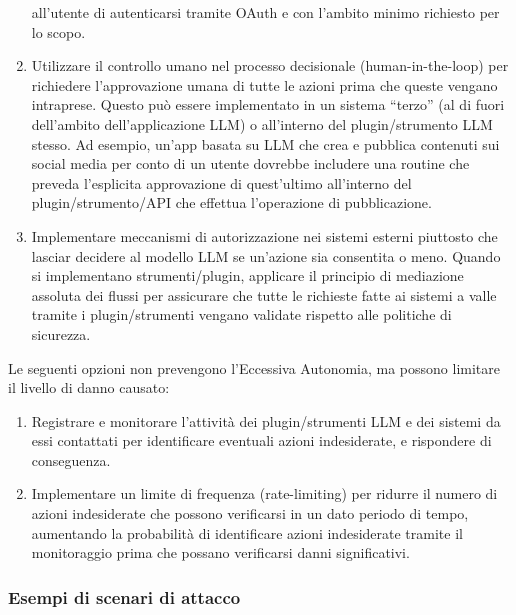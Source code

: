 \documentclass[
]{article}
\providecommand{\tightlist}{%
  \setlength{\itemsep}{0pt}\setlength{\parskip}{0pt}}
\begin{document}
\begin{enumerate}
  all'utente di autenticarsi tramite OAuth e con l'ambito minimo
  richiesto per lo scopo.
\item
  Utilizzare il controllo umano nel processo decisionale
  (human-in-the-loop) per richiedere l'approvazione umana di tutte le
  azioni prima che queste vengano intraprese. Questo può essere
  implementato in un sistema ``terzo'' (al di fuori dell'ambito
  dell'applicazione LLM) o all'interno del plugin/strumento LLM stesso.
  Ad esempio, un'app basata su LLM che crea e pubblica contenuti sui
  social media per conto di un utente dovrebbe includere una routine che
  preveda l'esplicita approvazione di quest'ultimo all'interno del
  plugin/strumento/API che effettua l'operazione di pubblicazione.
\item
  Implementare meccanismi di autorizzazione nei sistemi esterni
  piuttosto che lasciar decidere al modello LLM se un'azione sia
  consentita o meno. Quando si implementano strumenti/plugin, applicare
  il principio di mediazione assoluta dei flussi per assicurare che
  tutte le richieste fatte ai sistemi a valle tramite i plugin/strumenti
  vengano validate rispetto alle politiche di sicurezza.
\end{enumerate}

Le seguenti opzioni non prevengono l'Eccessiva Autonomia, ma possono
limitare il livello di danno causato:

\begin{enumerate}
\def\labelenumi{\arabic{enumi}.}
\tightlist
\item
  Registrare e monitorare l'attività dei plugin/strumenti LLM e dei
  sistemi da essi contattati per identificare eventuali azioni
  indesiderate, e rispondere di conseguenza.
\item
  Implementare un limite di frequenza (rate-limiting) per ridurre il
  numero di azioni indesiderate che possono verificarsi in un dato
  periodo di tempo, aumentando la probabilità di identificare azioni
  indesiderate tramite il monitoraggio prima che possano verificarsi
  danni significativi.
\end{enumerate}

\subsubsection{Esempi di scenari di
attacco}\label{esempi-di-scenari-di-attacco}
\end{document}
